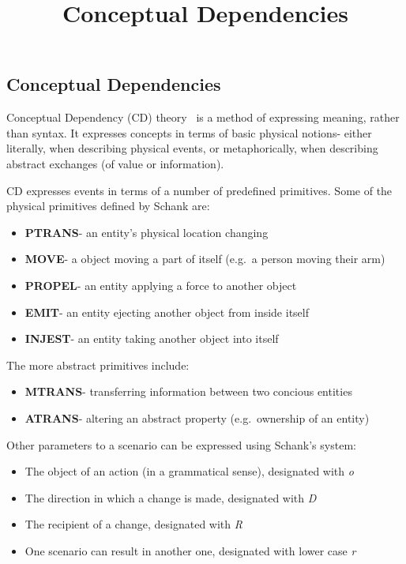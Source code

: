 \documentclass[dissertation.tex]{subfiles}
\title{Conceptual Dependencies}
\begin{document}
    \subsection{Conceptual Dependencies}

    Conceptual Dependency (CD) theory~\cite{SCHANK1972552} is a method of expressing meaning, rather than syntax. It expresses concepts in terms of basic physical notions- either literally, when describing physical events, or metaphorically, when describing abstract exchanges (of value or information). 

    CD expresses events in terms of a number of predefined primitives. Some of the physical primitives defined by Schank are:
    \begin{itemize}
        \item \textbf{PTRANS}- an entity's physical location changing
        \item \textbf{MOVE}- a object moving a part of itself (e.g.~a person moving their arm)
        \item \textbf{PROPEL}- an entity applying a force to another object
        \item \textbf{EMIT}- an entity ejecting another object from inside itself
        \item \textbf{INJEST}- an entity taking another object into itself
    \end{itemize}

    The more abstract primitives include:
    \begin{itemize}
        \item \textbf{MTRANS}- transferring information between two concious entities
        \item \textbf{ATRANS}- altering an abstract property (e.g.~ownership of an entity)
    \end{itemize}

    Other parameters to a scenario can be expressed using Schank's system:
    \begin{itemize}
        \item The object of an action (in a grammatical sense), designated with \emph{o}
        \item The direction in which a change is made, designated with \emph{D}
        \item The recipient of a change, designated with \emph{R}
        \item One scenario can result in another one, designated with lower case \emph{r}
    \end{itemize}
\end{document}
